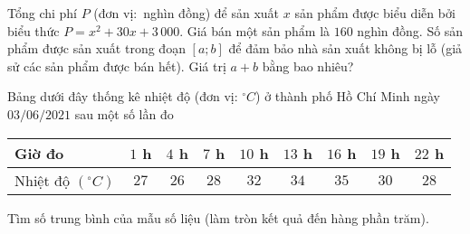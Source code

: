\begin{ex}%
	Tổng chi phí $P$ (đơn vị$\colon$ nghìn đồng) để sản xuất $x$ sản phẩm được biểu diễn bởi biểu thức $P = x^2 + 30x + 3\,000$. Giá bán một sản phẩm là $160$ nghìn đồng. Số sản phẩm được sản xuất trong đoạn $[a; b]$ để đảm bảo nhà sản xuất không bị lỗ (giả sử các sản phẩm được bán hết). Giá trị $a + b$ bằng bao nhiêu?
\end{ex}

\begin{ex}%
	Bảng dưới đây thống kê nhiệt độ (đơn vị: ${}^{\circ}{C}$) ở thành phố Hồ Chí Minh ngày $03 / 06 / 2021$ sau một số lần đo
	\begin{center}
		\begin{tabular}{|l|c|c|c|c|c|c|c|c|}
			\hline
			Giờ đo                                       & $1 $ h & $4 $ h & $7 $ h & $10 $ h & $13 $ h & $16 $ h & $19 $ h & $22 $ h \\
			\hline Nhiệt độ $\left({}^{\circ}{C}\right)$ & $27$   & $26$   & $28$   & $32$    & $34$    & $35$    & $30$    & $28$    \\
			\hline
		\end{tabular}
	\end{center}
	Tìm số trung bình của mẫu số liệu (làm tròn kết quả đến hàng phần trăm).
\end{ex}


